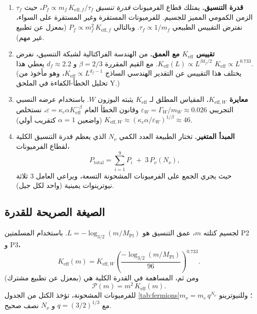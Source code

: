 \documentclass[12pt,a4paper]{article}
\begin{document}
	\begin{enumerate}[label=\textbf{P\arabic*}:, leftmargin=*]
		\item \textbf{قدرة التنسيق.} يمتلك قطاع الفرميونات \emph{قدرة تنسيق} \(P_f \propto m_f \, K_{\mathrm{eff},f}/\tau_f\)، حيث \(\tau_f\) الزمن الكمومي المميز للجسيم. للفرميونات المستقرة وغير المستقرة على السواء، نفترض التقييس الطبيعي \(\tau_f \propto 1/m_f\). وبالتالي \(P_f \propto m_f^2 \, K_{\mathrm{eff},f}\) (بمعزل عن تطبيع غير مهم).
		\item \textbf{تقييس \(K_{\mathrm{eff}}\) مع العمق.} من الهندسة الفراكتالية لشبكة التنسيق، نفرض \(K_{\mathrm{eff}}(L) \propto L^{\beta d_f/2}\). مع القيم المقررة \(\beta=2/3\) و \(d_f\approx2.2\) يعطي هذا \(K_{\mathrm{eff}} \propto L^{0.733}\). (يختلف هذا التقييس عن التقدير الهندسي الساذج \(K_{\mathrm{eff}}\propto L^{d_f-1}\)، وهو مأخوذ من تحليل الخطأ-الكفاءة في الملحق Y.)
		\item \textbf{معايرة \(K_{\mathrm{eff},W}\).} المقياس المطلق لـ \(K_{\mathrm{eff}}\) يثبته البوزون \(W\). باستخدام عرضه النسبي التجريبي \(\varepsilon_W = \Gamma_W/m_W \approx 0.026\) وقانون الخطأ العام \(\varepsilon = \kappa_c \alpha K_{\mathrm{eff}}^{-\beta}\)، نستخلص \(K_{\mathrm{eff},W} \approx (\kappa_c \alpha / \varepsilon_W)^{1/\beta} \approx 46\) (واضعين \(\alpha=1\) كتقريب أولي).
		\item \textbf{المبدأ المتغير.} تختار الطبيعة العدد الكمي \(N_{\nu}\) الذي يعظم قدرة التنسيق الكلية لقطاع الفرميونات،
		\begin{equation}
			P_{\mathrm{total}} = \sum_{i=1}^{9} P_i \;+\; 3\,P_{\nu}(N_{\nu}),
		\end{equation}
		حيث يجري الجمع على الفرميونات المشحونة التسعة، ويراعي العامل \(3\) ثلاثة نيوترينوات يمينية (واحد لكل جيل).
	\end{enumerate}
	
	\subsection{الصيغة الصريحة للقدرة}
	
	لجسيم كتلته \(m\)، عمق التنسيق هو \(L = -\log_{3/2}(m/M_{\mathrm{Pl}})\). باستخدام المسلمتين P2 و P3،
	\begin{equation}
		K_{\mathrm{eff}}(m) = K_{\mathrm{eff},W} \left( \frac{-\log_{3/2}(m/M_{\mathrm{Pl}})}{96} \right)^{0.733}.
	\end{equation}
	ومن ثم، المساهمة في القدرة الكلية هي (بمعزل عن تطبيع مشترك)
	\begin{equation}
		\mathcal{P}(m) = m^2 \, K_{\mathrm{eff}}(m).
	\end{equation}
	للفرميونات المشحونة، تؤخذ الكتل من الجدول \ref{tab:fermions}؛ وللنيوترينو \(m_{\nu} = m_e \, q^{N_{\nu}}\) مع \(q=(3/2)^{1/3}\) و \(N_{\nu}\) نصف صحيح.
	
\end{document}
